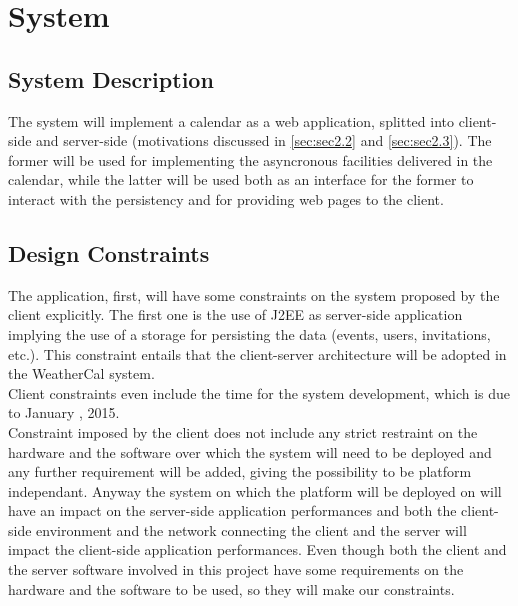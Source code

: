 \chapter{System} \label{cap:cap2}

\section{System Description}
The system will implement a calendar as a web application, splitted into client-side and server-side (motivations discussed in \autoref{sec:sec2.2} and \autoref{sec:sec2.3}). The former will be used for implementing the asyncronous facilities delivered in the calendar, while the latter will be used both as an interface for the former to interact with the persistency and for providing web pages to the client.

\section{Design Constraints} \label{sec:sec2.2}
The application, first, will have some constraints on the system proposed by the client explicitly. The first one is the use of J2EE as server-side application implying the use of a storage for persisting the data (events, users, invitations, etc.). This constraint entails that the client-server architecture will be adopted in the WeatherCal system.\\
Client constraints even include the time for the system development, which is due to January , 2015.\\
Constraint imposed by the client does not include any strict restraint on the hardware and the software over which the system will need to be deployed and any further requirement will be added, giving the possibility to be platform independant. Anyway the system on which the platform will be deployed on will have an impact on the server-side application performances and both the client-side environment and the network connecting the client and the server will impact the client-side application performances. Even though both the client and the server software involved in this project have some requirements on the hardware and the software to be used, so they will make our constraints.


